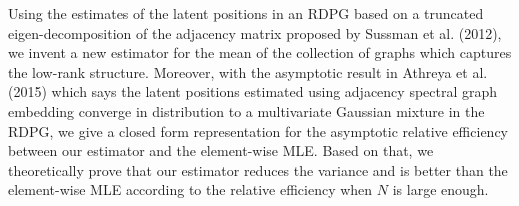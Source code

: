 Using the estimates of the latent positions in an RDPG based on a truncated eigen-decomposition of the adjacency matrix proposed by Sussman et al. (2012), we invent a new estimator for the mean of the collection of graphs which captures the low-rank structure. Moreover, with the asymptotic result in Athreya et al. (2015) which says the latent positions estimated using adjacency spectral graph embedding converge in distribution to a multivariate Gaussian mixture in the RDPG, we give a closed form representation for the asymptotic relative efficiency between our estimator and the element-wise MLE. Based on that, we theoretically prove that our estimator reduces the variance and is better than the element-wise MLE according to the relative efficiency when $N$ is large enough.



